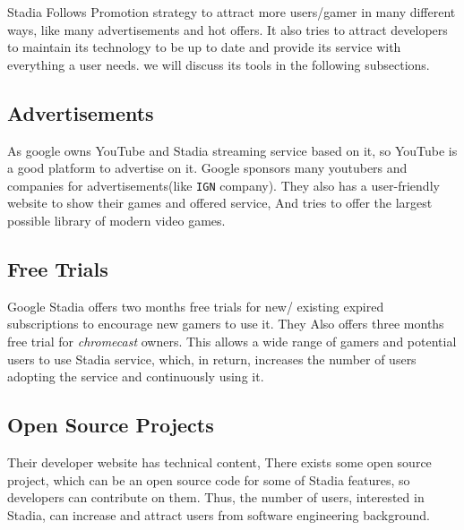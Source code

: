Stadia Follows  Promotion strategy to attract more users/gamer in many different ways,
like many advertisements and hot offers. It also tries to attract developers to maintain its technology to be up to date and provide its service with everything a user needs.
we will discuss its tools in the following subsections.


\subsection{Advertisements}
As google owns YouTube and Stadia streaming service based on it, so YouTube is a good platform to advertise on it. Google sponsors many youtubers and companies for advertisements(like \texttt{IGN} company). They also has a user-friendly website to show their games and offered service, And tries to offer the largest possible library of modern video games.

\subsection{Free Trials}
Google Stadia offers two months free trials for new/ existing expired subscriptions to encourage new gamers to use it. They Also offers three months free trial for \emph{chromecast} owners. This allows a wide range of gamers and potential users to use Stadia service, which, in return, increases the number of users adopting the service and continuously using it.

\subsection{Open Source Projects}
Their developer website has technical content, There exists some open source project, which can be an open source code for some of Stadia features, so developers can contribute on them. Thus, the number of users, interested in Stadia, can increase and attract users from software engineering background.
